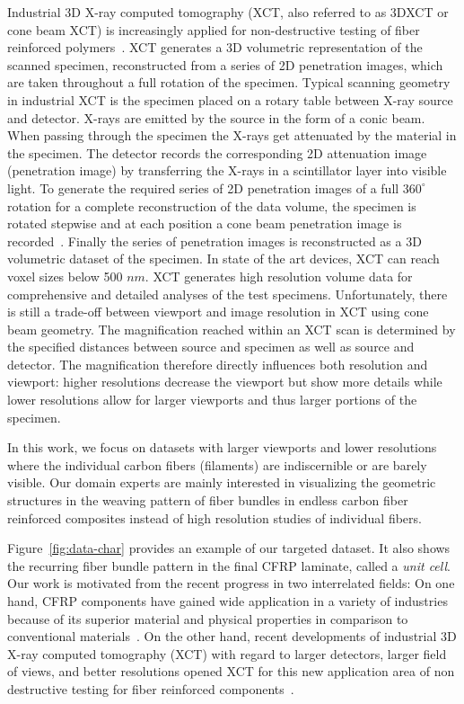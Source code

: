 Industrial 3D X-ray computed tomography (XCT, also referred to as 3DXCT or cone beam XCT) is increasingly applied for non-destructive testing of fiber reinforced polymers~\cite{Kastner2012}. XCT generates a 3D volumetric representation of the scanned specimen, reconstructed from a series of 2D penetration images, which are taken throughout a full rotation of the specimen. Typical scanning geometry in industrial XCT is the specimen placed on a rotary table between X-ray source and detector. X-rays are emitted by the source in the form of a conic beam. When passing through the specimen the X-rays get attenuated by the material in the specimen. The detector records the corresponding 2D attenuation image (penetration image) by transferring the X-rays in a scintillator layer into visible light. To generate the required series of 2D penetration images of a full $360^\circ$ rotation for a complete reconstruction of the data volume, the specimen is rotated stepwise and at each position a cone beam penetration image is recorded~\cite{heinzl-2008-thesis}. Finally the series of penetration images is  reconstructed as a 3D volumetric dataset of the specimen. 
In state of the art devices, XCT can reach voxel sizes below 500 $nm$. XCT generates high resolution volume data for comprehensive and detailed analyses of the test specimens. Unfortunately, there is still a trade-off between viewport and image resolution in XCT using cone beam geometry. The magnification reached within an XCT scan is determined by the specified distances between source and specimen as well as source and detector. The magnification therefore directly influences both resolution and viewport: higher resolutions decrease the viewport but show more details while lower resolutions allow for larger viewports and thus larger portions of the specimen.

In this work, we focus on datasets with larger viewports and lower resolutions where the individual carbon fibers (filaments) are indiscernible or are barely visible. Our domain experts are mainly interested in visualizing the geometric structures in the weaving pattern of fiber bundles in endless carbon fiber reinforced composites instead of high resolution studies of individual fibers.

Figure~\ref{fig:data-char} provides an example of our targeted dataset. It also shows the recurring fiber bundle pattern in the final CFRP laminate, called a \textit{unit cell}.
Our work is motivated from the recent progress in two interrelated fields: On one hand, CFRP components have gained wide application in a variety of industries  because of its superior material and physical properties in comparison to conventional materials~\cite{Karpat2012}. On the other hand, recent developments of industrial 3D X-ray computed tomography (XCT) with regard to larger detectors, larger field of views, and better resolutions opened XCT for this new application area of non destructive testing for fiber reinforced components~\cite{Schilling2005}. 


